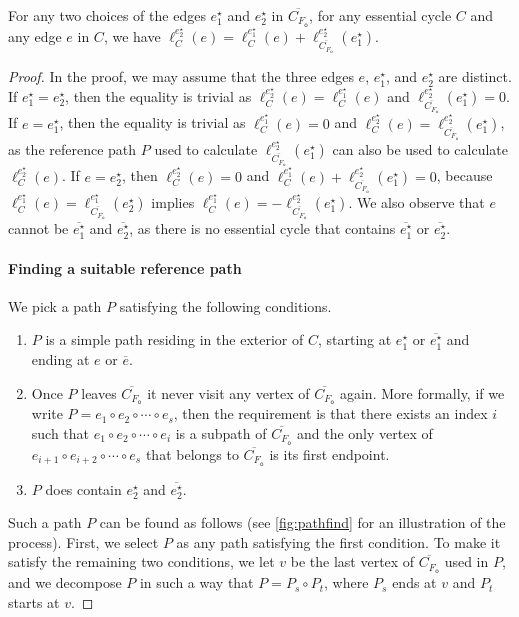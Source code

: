 \documentclass{article}\usepackage[a4paper,margin=20mm]{geometry}
\newcommand{\FO}{F_\mathsf{o}}
\newcommand{\eref}{e^\star}
\begin{document}
\begin{lemma}\label{lem:ref-edge}
For any two choices of the edges $\eref_1$ and $\eref_2$ in $\overline{C_{\FO}}$, for any essential cycle $C$ and any edge $e$ in $C$, we have $\ell_C^{\eref_2}(e)=\ell_C^{\eref_1}(e) + \ell_{\overline{C_{\FO}}}^{\eref_2}(\eref_1)$.
\end{lemma}
\begin{proof}
In the proof, we may assume that the three edges $e$, $\eref_1$, and $\eref_2$ are distinct.
If  $\eref_1 = \eref_2$, then the equality is trivial as $\ell_C^{\eref_2}(e)=\ell_C^{\eref_1}(e)$ and $\ell_{\overline{C_{\FO}}}^{\eref_2}(\eref_1) = 0$. If  $e = \eref_1$, then the equality is trivial as $\ell_C^{\eref_1}(e) = 0$ and $\ell_C^{\eref_2}(e)=  \ell_{\overline{C_{\FO}}}^{\eref_2}(\eref_1)$, as the reference path $P$ used to calculate $\ell_{\overline{C_{\FO}}}^{\eref_2}(\eref_1)$ can also be used to calculate $\ell_C^{\eref_2}(e)$.
If  $e = \eref_2$, then $\ell_C^{\eref_2}(e)=0$ and $\ell_C^{\eref_1}(e) + \ell_{\overline{C_{\FO}}}^{\eref_2}(\eref_1) = 0$, because $\ell_C^{\eref_1}(e)=\ell_{\overline{C_{\FO}}}^{\eref_1}(\eref_2)$ implies $\ell_C^{\eref_1}(e) = - \ell_{\overline{C_{\FO}}}^{\eref_2}(\eref_1)$.
We also observe that $e$ cannot be $\overline{\eref_1}$ and $\overline{\eref_2}$, as there is no essential cycle that contains  $\overline{\eref_1}$ or $\overline{\eref_2}$.

\paragraph{Finding a suitable reference path}
We pick a path $P$ satisfying the following conditions.
\begin{enumerate}
    \item $P$ is a simple path residing in the exterior of $C$, starting at $\eref_1$ or $\overline{\eref_1}$ and ending at $e$ or  $\overline{e}$.
    \item Once $P$ leaves $\overline{C_{\FO}}$ it never visit any vertex of $\overline{C_{\FO}}$ again. More formally, if we write $P = e_1 \circ e_2 \circ \cdots \circ e_s$, then the requirement is that there exists an index $i$ such that  $e_1 \circ e_2 \circ \cdots \circ e_i$ is a subpath of $\overline{C_{\FO}}$ and the only vertex of  $e_{i+1} \circ e_{i+2} \circ \cdots \circ e_s$ that belongs to $\overline{C_{\FO}}$ is its first endpoint.
    \item $P$ does contain $\eref_2$ and $\overline{\eref_2}$.
\end{enumerate}
Such a path $P$ can be found as follows (see \cref{fig:pathfind} for an illustration of the process). First, we select $P$ as any path satisfying the first condition. To make it satisfy the remaining two conditions, we let $v$ be the last vertex of $\overline{C_{\FO}}$ used in $P$, and we decompose $P$ in such a way that $P=P_s \circ P_t$, where $P_s$ ends at $v$ and $P_t$ starts at $v$. 


\end{proof}
\end{document}
